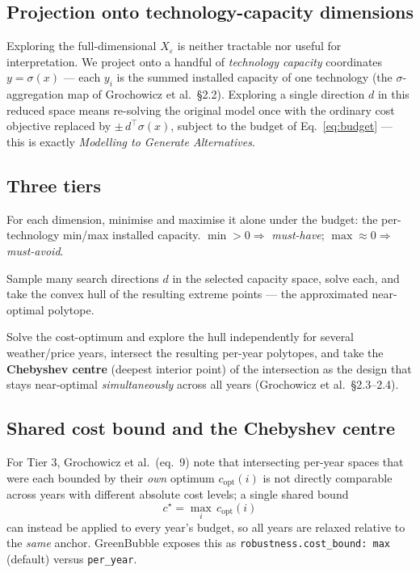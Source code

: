 \documentclass[11pt]{article}
\begin{document}
\subsection{Projection onto technology-capacity dimensions}
Exploring the full-dimensional $X_\varepsilon$ is neither tractable nor
useful for interpretation. We project onto a handful of \emph{technology
capacity} coordinates $y = \sigma(x)$ --- each $y_i$ is the summed installed
capacity of one technology (the $\sigma$-aggregation map of Grochowicz et
al.\ \S 2.2). Exploring a single direction $d$ in this reduced space means
re-solving the original model once with the ordinary cost objective
replaced by $\pm\, d^\top \sigma(x)$, subject to the budget of
Eq.~\eqref{eq:budget} --- this is exactly \emph{Modelling to Generate
Alternatives}.

\subsection{Three tiers}
\begin{description}[leftmargin=1.4em]
  \item[Tier 1 --- ranges.] For each dimension, minimise and maximise it
    alone under the budget: the per-technology min/max installed capacity.
    $\min > 0 \Rightarrow$ \emph{must-have}; $\max \approx 0 \Rightarrow$
    \emph{must-avoid}.
  \item[Tier 2 --- hull.] Sample many search directions $d$ in the selected
    capacity space, solve each, and take the convex hull of the resulting
    extreme points --- the approximated near-optimal polytope.
  \item[Tier 3 --- robustness.] Solve the cost-optimum and explore the hull
    independently for several weather/price years, intersect the resulting
    per-year polytopes, and take the \textbf{Chebyshev centre} (deepest
    interior point) of the intersection as the design that stays
    near-optimal \emph{simultaneously} across all years (Grochowicz et al.\
    \S 2.3--2.4).
\end{description}

\subsection{Shared cost bound and the Chebyshev centre}
For Tier 3, Grochowicz et al.\ (eq.\ 9) note that intersecting per-year
spaces that were each bounded by their \emph{own} optimum $c_{\mathrm{opt}}(i)$
is not directly comparable across years with different absolute cost
levels; a single shared bound
\begin{equation}
  c^\star = \max_i\, c_{\mathrm{opt}}(i)
\end{equation}
can instead be applied to every year's budget, so all years are relaxed
relative to the \emph{same} anchor. GreenBubble exposes this as
\texttt{robustness.cost\_bound: max} (default) versus \texttt{per\_year}.
\end{document}
